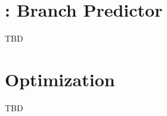 \documentclass[11pt]{article}
\begin{document}


\tableofcontents
\newpage










\section{\branchPredictorTaskName: Branch Predictor}
TBD
\newpage

\section{Optimization}
TBD
\newpage


\begin{appendices}

\end{appendices}
\end{document}
